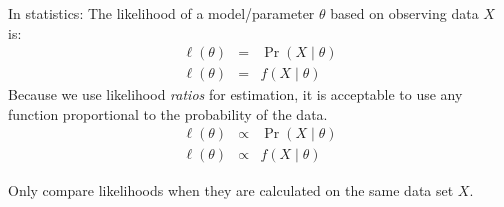\documentclass[landscape]{foils}
\begin{document}
In statistics:
The likelihood of a model/parameter $\theta$ based on observing data $X$ is:
\begin{eqnarray*}
  \ell(\theta) & = & \Pr(X \mid \theta) \\
  \ell(\theta) & = & f(X \mid \theta)
\end{eqnarray*}
Because we use likelihood {\em ratios} for estimation, it is acceptable
to use any function proportional to the probability of the data.
\begin{eqnarray*}
  \ell(\theta) & \propto & \Pr(X \mid \theta) \\
  \ell(\theta) & \propto & f(X \mid \theta)
\end{eqnarray*}

Only compare likelihoods when they are calculated on the same data set $X$.
\end{document}
